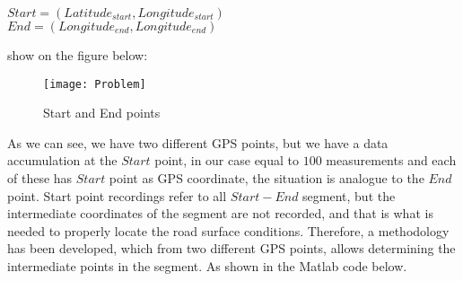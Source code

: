 \documentclass[tesi]{subfiles}
\begin{document}
\begin{center}
 $Start = (Latitude_{start}, Longitude_{start})$\\
 $End = (Longitude_{end}, Longitude_{end})$
\end{center}

show on the figure below:
\begin{figure}[H]	
\centering
\texttt{[image: Problem]} \label{GPS Points Problem}
 \caption{Start and End points}
  \label{fig:GPS Points Problem}
\end{figure}


As we can see, we have two different GPS points, but we have a data accumulation at the $Start$ point, in our case equal to $100$ measurements and each of these has $Start$ point as GPS coordinate, the situation is analogue to the $End$ point.
Start point recordings refer to all $Start-End$ segment, but the intermediate coordinates of the segment are not recorded, and that is what is needed to properly locate the road surface conditions.
Therefore, a methodology has been developed, which from two different GPS points, allows determining the intermediate points in the segment. As shown in the Matlab code below.
\end{document}
